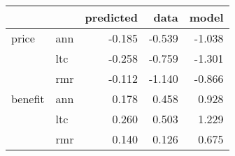 \begin{tabular}{llrrr}
\toprule
        &     &  predicted &   data &  model \\
\midrule
price & ann &     -0.185 & -0.539 & -1.038 \\
        & ltc &     -0.258 & -0.759 & -1.301 \\
        & rmr &     -0.112 & -1.140 & -0.866 \\
benefit & ann &      0.178 &  0.458 &  0.928 \\
        & ltc &      0.260 &  0.503 &  1.229 \\
        & rmr &      0.140 &  0.126 &  0.675 \\
\bottomrule
\end{tabular}
